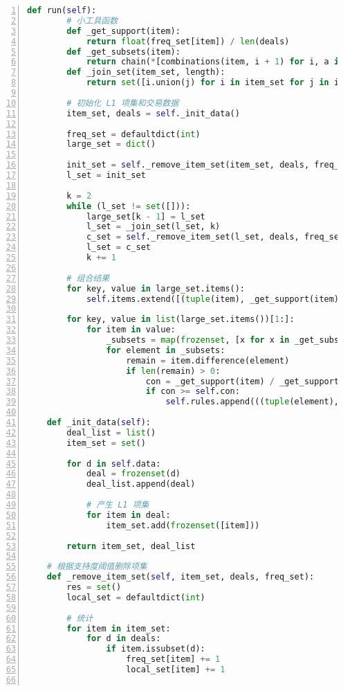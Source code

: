 \documentclass[12pt,a4paper]{article}
\theoremstyle{definition}
\begin{document}
\begin{appendix}
\begin{lstlisting}[language=Python,
	numbers=left,
	keywordstyle=\color{blue!70},
	frame=shadowbox,
	breaklines=True]
    def run(self):
        # 小工具函数
        def _get_support(item):
            return float(freq_set[item]) / len(deals)
        def _get_subsets(item):
            return chain(*[combinations(item, i + 1) for i, a in enumerate(item)])
        def _join_set(item_set, length):
            return set([i.union(j) for i in item_set for j in item_set if len(i.union(j)) == length])

        # 初始化 L1 项集和交易数据
        item_set, deals = self._init_data()

        freq_set = defaultdict(int)
        large_set = dict()

        init_set = self._remove_item_set(item_set, deals, freq_set)
        l_set = init_set

        k = 2
        while (l_set != set([])):
            large_set[k - 1] = l_set
            l_set = _join_set(l_set, k)
            c_set = self._remove_item_set(l_set, deals, freq_set)
            l_set = c_set
            k += 1

        # 组合结果
        for key, value in large_set.items():
            self.items.extend([(tuple(item), _get_support(item)) for item in value])

        for key, value in list(large_set.items())[1:]:
            for item in value:
                _subsets = map(frozenset, [x for x in _get_subsets(item)])
                for element in _subsets:
                    remain = item.difference(element)
                    if len(remain) > 0:
                        con = _get_support(item) / _get_support(element)
                        if con >= self.con:
                            self.rules.append(((tuple(element), tuple(remain)), con))

    def _init_data(self):
        deal_list = list()
        item_set = set()

        for d in self.data:
            deal = frozenset(d)
            deal_list.append(deal)

            # 产生 L1 项集
            for item in deal:
                item_set.add(frozenset([item]))

        return item_set, deal_list

    # 根据支持度阈值删除项集
    def _remove_item_set(self, item_set, deals, freq_set):
        res = set()
        local_set = defaultdict(int)

        # 统计
        for item in item_set:
            for d in deals:
                if item.issubset(d):
                    freq_set[item] += 1
                    local_set[item] += 1


\end{lstlisting}
\end{appendix}
\end{document}
